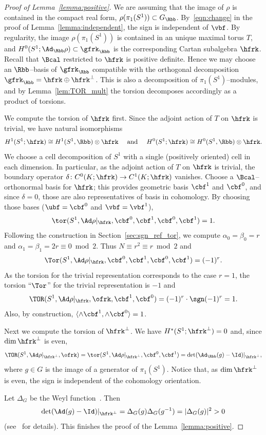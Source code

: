 \begin{proof}[Proof of Lemma~\ref{lemma:positive}]
We are assuming that the image of $\rho$ is contained in the compact real form, $\rho(\pi_1(S^1))\subset G_\Rbb$. By~\eqref{eqn:change} in the proof of Lemma~\ref{lemma:independent}, the sign is independent of $\vbf$. By regularity, the image $\rho(\pi_1(S^1))$ is contained in an unique maximal torus $T$, and $H^0(S^1;\Ad_\Rbb\rho)\subset \gfrk_\Rbb$ is the corresponding Cartan subalgebra $\hfrk$. Recall that $\Bcal$ restricted to $\hfrk$ is positive definite. Hence we may choose an ${\Rbb}$--basis of $\gfrk_{\Rbb}$ compatible with the orthogonal decomposition $\gfrk_{\Rbb}=\hfrk \oplus \hfrk^\perp$. This is also a decomposition of $\pi_1(S^1)$--modules, and by Lemma~\ref{lem:TOR_mult} the torsion decomposes accordingly as a product of torsions.


We compute the torsion of $\hfrk $ first. Since the adjoint action of $T$ on $\hfrk $ is trivial, we have natural isomorphisms
\begin{equation}\label{eqn:isos}
H^1(S^1;\hfrk)\cong H^1(S^1,\Rbb)\otimes \hfrk\quad\text{ and }\quad H^0(S^1;\hfrk)\cong H^0(S^1,\Rbb)\otimes \hfrk.
\end{equation}
We choose a cell decomposition of $S^1$ with a single (positively oriented) cell in each dimension. In particular, as the adjoint action of $T$ on $\hfrk$ is trivial, the boundary operator $ \delta\colon C^0(K;\hfrk)\to C^1(K;\hfrk) $ vanishes. Choose a $\Bcal$--orthonormal basis for $\hfrk$; this provides geometric basis $\cbf^1$ and $\cbf^0$, and since $\delta=0$, those are also representatives of basis in cohomology. By choosing those bases ($\ubf=\cbf^0$ and $\vbf=\vbf^1$),
\[
\tor(S^1, \Ad\rho\vert_{\hfrk}, \cbf^0,\cbf^1, \cbf^0,\cbf^1)=1.
\]
Following the construction in Section~\ref{sec:sgn_ref_tor}, we compute $\alpha_0=\beta_0=r$ and $\alpha_1=\beta_1=2r\equiv 0 \bmod 2$. Thus $N \equiv r^2\equiv r\bmod 2$ and
\[
\Tor(S^1, \Ad\rho\vert_{\hfrk}, \cbf^0,\cbf^1, \cbf^0,\cbf^1)=(-1)^r.
\]
As the torsion for the trivial representation corresponds to the case $r=1$, the torsion ``$\Tor$'' for the trivial representation is $-1$ and
\begin{equation}\label{eqn:TORCartan}
\TOR(S^1, \Ad\rho\vert_{\hfrk},\ofrk, \cbf^1,\cbf^0)=(-1)^r\cdot\sgn(-1)^r= 1.
\end{equation}
Also, by construction, $\langle \wedge{\cbf^1},\wedge{\cbf^0}\rangle=1$.


Next we compute the torsion of $\hfrk^\perp $. We have $H^*(S^1;\hfrk^\perp)=0$ and, since $\dim\hfrk^\perp$ is even,
\[
\TOR(S^1,\Ad\rho\vert_{ \hfrk^\perp},\ofrk) =\tor(S^1,\Ad\rho\vert_{ \hfrk^\perp},\cbf^0,\cbf^1) =\det (\Ad_\Rbb(g)-\Id)\vert_{ \hfrk^\perp },
\]
where $g\in G$ is the image of a generator of $\pi_1(S^1)$. Notice that, as $\dim \hfrk^\perp$ is even, the sign is independent of the cohomology orientation.

Let $\Delta_G$ be the Weyl function~\cite{GoodWall}. Then
\[
\det (\Ad(g)-\Id)\vert_{ \hfrk^\perp }= \Delta_G(g) \Delta_G(g^{-1})= \vert \Delta_G(g) \vert ^2>0
\]
(see~\cite[(7.47)]{GoodWall} for details). This finishes the proof of the Lemma~\ref{lemma:positive}.
\end{proof}

